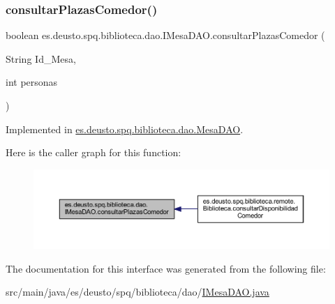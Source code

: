 \subsubsection{\texorpdfstring{consultar\+Plazas\+Comedor()}{consultarPlazasComedor()}}
{\footnotesize\ttfamily boolean es.\+deusto.\+spq.\+biblioteca.\+dao.\+I\+Mesa\+D\+A\+O.\+consultar\+Plazas\+Comedor (\begin{DoxyParamCaption}\item[{String}]{Id\+\_\+\+Mesa,  }\item[{int}]{personas }\end{DoxyParamCaption})}



Implemented in \mbox{\hyperlink{classes_1_1deusto_1_1spq_1_1biblioteca_1_1dao_1_1_mesa_d_a_o_a7631ebe9a7d3215db433ac29bb3e75c4}{es.\+deusto.\+spq.\+biblioteca.\+dao.\+Mesa\+D\+AO}}.

Here is the caller graph for this function\+:
\nopagebreak
\begin{figure}[H]
\begin{center}
\leavevmode
\includegraphics[width=350pt]{interfacees_1_1deusto_1_1spq_1_1biblioteca_1_1dao_1_1_i_mesa_d_a_o_a82ff152d68c25134fdffa41a1b08a347_icgraph}
\end{center}
\end{figure}


The documentation for this interface was generated from the following file\+:\begin{DoxyCompactItemize}
\item 
src/main/java/es/deusto/spq/biblioteca/dao/\mbox{\hyperlink{_i_mesa_d_a_o_8java}{I\+Mesa\+D\+A\+O.\+java}}\end{DoxyCompactItemize}
